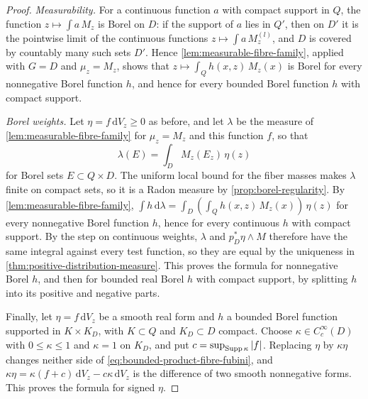 \begin{proof}
\emph{Measurability.} For a continuous function $a$ with compact support in $Q$, the function $z\mapsto\int a\,M_z$ is Borel on $D$: if the support of $a$ lies in $Q'$, then on $D'$ it is the pointwise limit of the continuous functions $z\mapsto\int a\,M_z^{(l)}$, and $D$ is covered by countably many such sets $D'$. Hence \cref{lem:measurable-fibre-family}, applied with $G=D$ and $\mu_z=M_z$, shows that $z\mapsto\int_Qh(x,z)\,M_z(x)$ is Borel for every nonnegative Borel function $h$, and hence for every bounded Borel function $h$ with compact support.

\emph{Borel weights.} Let $\eta=f\,\mathrm dV_z\geq0$ as before, and let $\lambda$ be the measure of \cref{lem:measurable-fibre-family} for $\mu_z=M_z$ and this function $f$, so that
\[
 \lambda(E)=\int_D M_z(E_z)\,\eta(z)
\]
for Borel sets $E\subset Q\times D$. The uniform local bound for the fiber masses makes $\lambda$ finite on compact sets, so it is a Radon measure by \cref{prop:borel-regularity}. By \cref{lem:measurable-fibre-family}, $\int h\,\mathrm d\lambda=\int_D(\int_Qh(x,z)\,M_z(x))\,\eta(z)$ for every nonnegative Borel function $h$, hence for every continuous $h$ with compact support. By the step on continuous weights, $\lambda$ and $p_D^*\eta\wedge M$ therefore have the same integral against every test function, so they are equal by the uniqueness in \cref{thm:positive-distribution-measure}. This proves the formula for nonnegative Borel $h$, and then for bounded real Borel $h$ with compact support, by splitting $h$ into its positive and negative parts.

Finally, let $\eta=f\,\mathrm dV_z$ be a smooth real form and $h$ a bounded Borel function supported in $K\times K_D$, with $K\subset Q$ and $K_D\subset D$ compact. Choose $\kappa\in C_c^\infty(D)$ with $0\leq\kappa\leq1$ and $\kappa=1$ on $K_D$, and put $c=\sup_{\operatorname{Supp}\kappa}|f|$. Replacing $\eta$ by $\kappa\eta$ changes neither side of \eqref{eq:bounded-product-fibre-fubini}, and $\kappa\eta=\kappa(f+c)\,\mathrm dV_z-c\kappa\,\mathrm dV_z$ is the difference of two smooth nonnegative forms. This proves the formula for signed $\eta$.
\end{proof}

